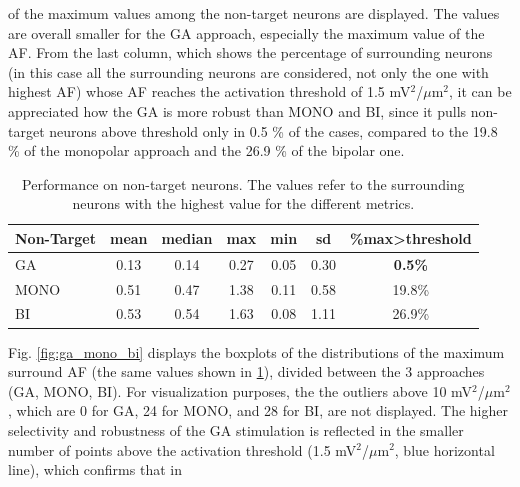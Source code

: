 \documentclass[conference]{IEEEtran}
\begin{document}
of the maximum values among the non-target neurons are displayed.
The values are overall smaller for the GA approach, especially the
maximum value of the AF. From the last column, which shows the percentage
of surrounding neurons (in this case all the surrounding neurons are
considered, not only the one with highest AF) whose AF reaches the
activation threshold of 1.5 mV$^{2}$/$\mu$m$^{2}$, it can
be appreciated how the GA is more robust than MONO and BI, since it
pulls non-target neurons above threshold only in 0.5 \% of the cases,
compared to the 19.8 \% of the monopolar approach and the 26.9 \%
of the bipolar one.\\
\begin{table}[t]
\begin{centering}
\begin{tabular}{lcccccc}
\textbf{Non-Targe}t & {\scriptsize{}mean} & {\scriptsize{}median} & {\scriptsize{}max} & {\scriptsize{}min} & {\scriptsize{}sd} & {\scriptsize{}\%max>threshold}\tabularnewline
\hline 
\noalign{\vskip\doublerulesep}
{\scriptsize{}GA} & {\footnotesize{}0.13} & {\footnotesize{}0.14} & {\footnotesize{}0.27} & {\footnotesize{}0.05} & {\footnotesize{}0.30} & \textbf{\footnotesize{}0.5\%}\tabularnewline
\noalign{\vskip\doublerulesep}
{\scriptsize{}MONO} & {\footnotesize{}0.51} & {\footnotesize{}0.47} & {\footnotesize{}1.38} & {\footnotesize{}0.11} & {\footnotesize{}0.58} & {\footnotesize{}19.8\%}\tabularnewline
\noalign{\vskip\doublerulesep}
{\scriptsize{}BI} & {\footnotesize{}0.53} & {\footnotesize{}0.54} & {\footnotesize{}1.63} & {\footnotesize{}0.08} & 1.11 & {\footnotesize{}26.9\%}\tabularnewline
\end{tabular}\medskip{}

\par\end{centering}

\caption{\label{tab:surr} Performance on non-target neurons. The values refer
to the surrounding neurons with the highest value for the different
metrics.}
\end{table}
Fig. \ref{fig:ga_mono_bi} displays the boxplots of the distributions
of the maximum surround AF (the same values shown in \ref{tab:surr}),
divided between the 3 approaches (GA, MONO, BI). For visualization purposes, the
the outliers above 10 mV$^{2}$/$\mu$m$^{2}$, which are 0 for GA, 24 for MONO,
 and 28 for BI, are not displayed. The higher selectivity
and robustness of the GA stimulation is reflected in the smaller number
of points above the activation threshold (1.5
mV$^{2}$/$\mu$m$^{2}$, blue horizontal line), which confirms that in 
\end{document}
